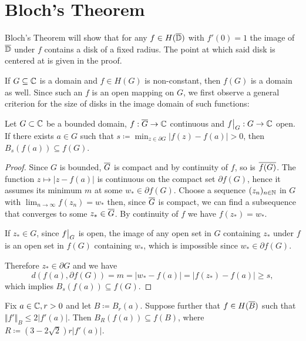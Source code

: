 \section{Bloch's Theorem}
\label{sec:blochs-theorem}

Bloch's Theorem will show that for any $f \in H(\overline{\mathbb{D}})$ with $f'(0) = 1$ the image of $\overline{\mathbb{D}}$ under $f$ contains a disk of a fixed radius. The point at which said disk is centered at is given in the proof.

If $G \subseteq \mathbb{C}$ is a domain and $f \in H(G)$ is non-constant, then $f(G)$ is a domain as well. Since such an $f$ is an open mapping on $G$, we first observe a general criterion for the size of disks in the image domain of such functions:

\begin{lemma} \label{lem:bloch-lemma-1}
    Let $G \subset \mathbb{C}$ be a bounded domain, $f : \overline{G} \to \mathbb{C}$ continuous and $\restr{f}{G} : G \to \C$ open. If there exists $a \in G$ such that $s \coloneqq \min_{z \in \partial G} \vert f(z) - f(a) \vert > 0$, then $B_{s}(f(a)) \subseteq f(G)$.
\end{lemma}

\begin{proof}
    Since $G$ is bounded, $\overline{G}$ is compact and by continuity of $f$, so is $\overline{f(G)}$.
    The function $z \mapsto \vert z - f(a) \vert$ is continuous on the compact set $\partial f(G)$, hence it assumes its minimum $m$ at some $w_* \in \partial f(G)$. Choose a sequence $(z_n)_{n \in \mathbb{N}}$ in $G$ with $\lim_{n \to \infty} f(z_n) = w_*$ then, since $\overline{G}$ is compact, we can find a subsequence that converges to some $z_* \in \overline{G}$. By continuity of $f$ we have $f(z_*) = w_*$.

    If $z_* \in G$, since $\restr{f}{G}$ is open, the image of any open set in $G$ containing $z_*$ under $f$ is an open set in $f(G)$ containing $w_*$, which is impossible since $w_* \in \partial f(G)$.

    Therefore $z_* \in \partial G$ and we have
    $$ d(f(a), \partial f(G)) = m = \vert w_* - f(a) \vert = \vert f(z_*) - f(a) \vert \geq s, $$
    which implies $B_{s}(f(a)) \subseteq f(G)$.
\end{proof}

\begin{lemma} \label{lem:bloch-lemma-2}
    Fix $a \in \mathbb{C}, r > 0$ and let $B \coloneqq B_{r}(a)$. Suppose further that $f \in H(\overline{B})$ such that $\Vert f' \Vert_B \leq 2 \vert f'(a) \vert$. Then $ B_{R}(f(a)) \subseteq f(B)$, where $ R \coloneqq (3 - 2 \sqrt{2}) r \vert f'(a) \vert $.
\end{lemma}

